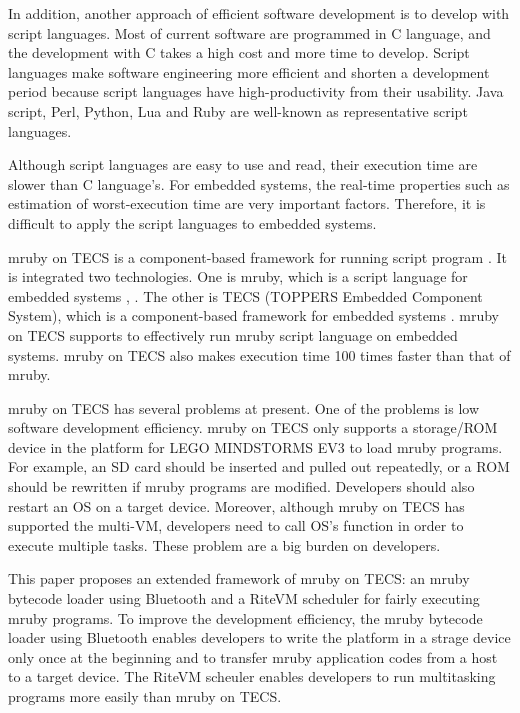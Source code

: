 \documentclass[a4j,12pt,oneside,openany,english]{jsbook}
\begin{document}
In addition, another approach of efficient software development is to develop with script languages.
Most of current software are programmed in C language, and the development with C takes a high cost and more time to develop.
Script languages make software engineering more efficient and shorten a development period because script languages have high-productivity from their usability.
Java script, Perl, Python, Lua and Ruby are well-known as representative script languages.

Although script languages are easy to use and read, their execution time are slower than C language's.
For embedded systems, the real-time properties such as estimation of worst-execution time are very important factors.
Therefore, it is difficult to apply the script languages to embedded systems.

mruby on TECS is a component-based framework for running script program \cite{par:mrubyonTECS}.
It is integrated two technologies.
One is mruby, which is a script language for embedded systems \cite{par:mruby}, \cite{url:mruby}.
The other is TECS (TOPPERS Embedded Component System), which is a component-based framework for embedded systems \cite{par:TECS} \cite{url:TOPPERS}.
mruby on TECS supports to effectively run mruby script language on embedded systems.
mruby on TECS also makes execution time 100 times faster than that of mruby.

mruby on TECS has several problems at present.
One of the problems is low software development efficiency.
mruby on TECS only supports a storage/ROM device in the platform for LEGO MINDSTORMS EV3 \cite{par:EV3} to load mruby programs.
For example, an SD card should be inserted and pulled out repeatedly, or a ROM should be rewritten if mruby programs are modified.
Developers should also restart an OS on a target device.
Moreover, although mruby on TECS has supported the multi-VM, developers need to call OS's function in order to execute multiple tasks.
These problem are a big burden on developers.

This paper proposes an extended framework of mruby on TECS: an mruby bytecode loader using Bluetooth and a RiteVM scheduler for fairly executing mruby programs.
To improve the development efficiency, the mruby bytecode loader using Bluetooth enables developers to write the platform in a strage device only once at the beginning and to transfer mruby application codes from a host to a target device.
The RiteVM scheuler enables developers to run multitasking programs more easily than mruby on TECS.
\end{document}
